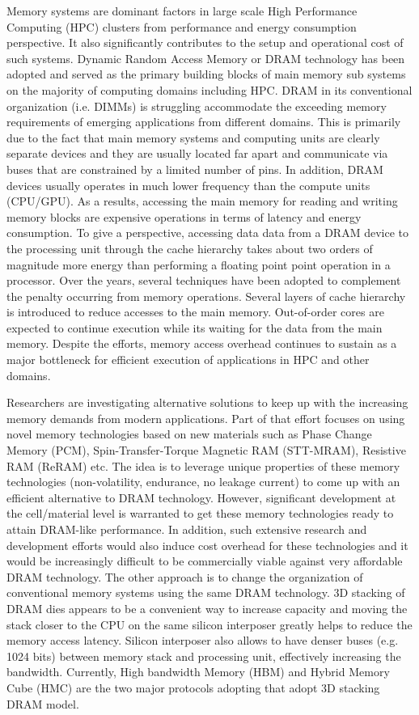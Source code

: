Memory systems are dominant factors in large scale High Performance Computing (HPC) clusters from performance and energy consumption perspective. It also significantly contributes to the setup and operational cost of such systems. Dynamic Random Access Memory or DRAM technology has been adopted and served as the primary building blocks of main memory sub systems on the majority of computing domains including HPC. DRAM in its conventional organization (i.e. DIMMs) is struggling accommodate the exceeding memory requirements of emerging applications from different domains. This is primarily due to the fact that main memory systems and computing units are clearly separate devices and they are usually located far apart and communicate via buses that are constrained by a limited number of pins. In addition, DRAM devices usually operates in much lower frequency than the compute units (CPU/GPU). As a results, accessing the main memory for reading and writing memory blocks are expensive operations in terms of latency and energy consumption. To give a perspective, accessing data data from a DRAM device to the processing unit through the cache hierarchy takes about two orders of magnitude more energy than performing a floating point point operation in a processor. Over the years, several techniques have been adopted to complement the penalty occurring from memory operations. Several layers of cache hierarchy is introduced to reduce accesses to the main memory. Out-of-order cores are expected to continue execution while its waiting for the data from the main memory. Despite the efforts, memory access overhead continues to sustain as a major bottleneck for efficient execution of applications in HPC and other domains.

Researchers are investigating alternative solutions to keep up with the increasing memory demands from modern applications. Part of that effort focuses on using novel memory technologies based on new materials such as Phase Change Memory (PCM), Spin-Transfer-Torque Magnetic RAM (STT-MRAM), Resistive RAM (ReRAM) etc. The idea is to leverage unique properties of these memory technologies (non-volatility, endurance, no leakage current) to come up with an efficient alternative to DRAM technology. However, significant development at the cell/material level is warranted to get these memory technologies ready to attain DRAM-like performance. In addition, such extensive research and development efforts would also induce cost overhead for these technologies and it would be increasingly difficult to be commercially viable against very affordable DRAM technology.   
The other approach is to change the organization of conventional memory systems using the same DRAM technology. 3D stacking of DRAM dies appears to be a convenient way to increase capacity and moving the stack closer to the CPU on the same silicon interposer greatly helps to reduce the memory access latency. Silicon interposer also allows to have denser buses (e.g. 1024 bits) between memory stack and processing unit, effectively increasing the bandwidth. Currently, High bandwidth Memory (HBM) and Hybrid Memory Cube (HMC) are the two major protocols adopting that adopt 3D stacking DRAM model.        

